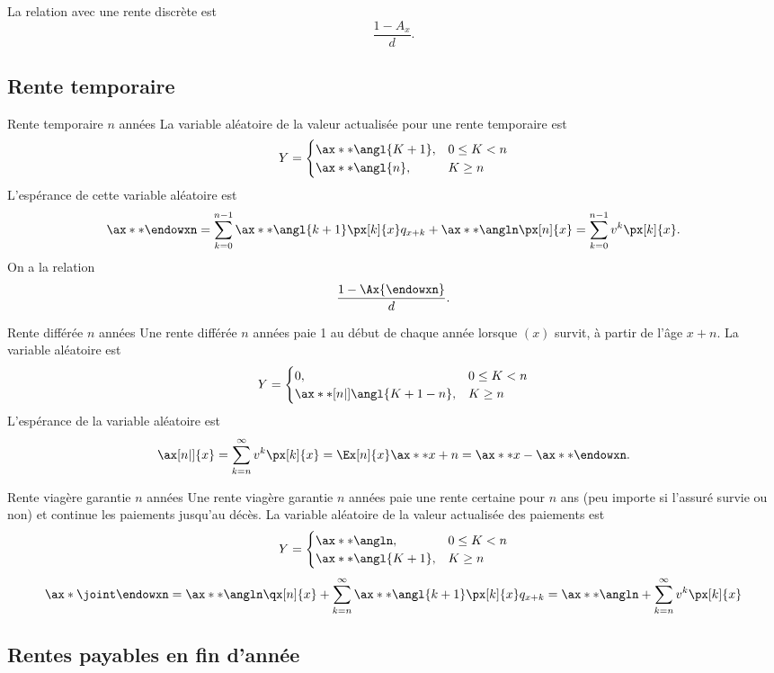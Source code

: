 La relation avec une rente discrète est 
$$\frac{1 - A_x}{d}.$$

\subsection{Rente temporaire}

\begin{definition}{Rente temporaire $n$ années}{}
	La variable aléatoire de la valeur actualisée pour une rente temporaire est 
	$$Y = \begin{cases}
	\ax**{\angl{K + 1}}, & 0\leq K < n \\
	\ax**{\angl{n}},     & K \geq n
	\end{cases}$$
	L'espérance de cette variable aléatoire est 
	$$\ax**{\endowxn} = \sum_{k = 0}^{n - 1} \ax**{\angl{k+1}} \px[k]{x}q_{x+k} + \ax**{\angln}\px[n]{x} = \sum_{k = 0}^{n-1}v^k \px[k]{x}.$$
	On a la relation 
	$$\frac{1 - \Ax{\endowxn}}{d}.$$
\end{definition}

\begin{definition}{Rente différée $n$ années}{}
	Une rente différée $n$ années paie 1 au début de chaque année lorsque $(x)$ survit, à partir de l'âge $x + n$. La variable aléatoire est 
	$$Y = \begin{cases}
	0,& 0\leq K < n\\
	\ax**[n|]{\angl{K + 1 - n}}, & K \geq n
	\end{cases}$$
	L'espérance de la variable aléatoire est 
	$$\ax[n|]{x} = \sum_{k = n}^{\infty} v^k \px[k]{x} = \Ex[n]{x} \ax**{x + n} = \ax**{x} - \ax**{\endowxn}.$$
\end{definition}

\begin{definition}{Rente viagère garantie $n$ années}{}
	Une rente viagère garantie $n$ années paie une rente certaine pour $n$ ans (peu importe si l'assuré survie ou non) et continue les paiements jusqu'au décès. La variable aléatoire de la valeur actualisée des paiements est 
	$$Y = \begin{cases}
	\ax**{\angln}, & 0\leq K < n\\
	\ax**{\angl{K + 1}}, & K \geq n
	\end{cases}$$
	$$\ax*{\joint\endowxn} = \ax**{\angln} \qx[n]{x} + \sum_{k = n}^{\infty} \ax**{\angl{k + 1}} \px[k]{x}q_{x+k} = \ax**{\angln} + \sum_{k = n}^{\infty} v^k \px[k]{x}$$
\end{definition}

\subsection{Rentes payables en fin d'année}

